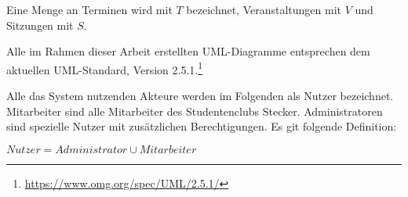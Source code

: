 Eine Menge an Terminen wird mit $T$ bezeichnet, Veranstaltungen mit $V$ und Sitzungen mit $S$.

Alle im Rahmen dieser Arbeit erstellten UML-Diagramme entsprechen dem aktuellen UML-Standard, Version 2.5.1.\footnote{\url{https://www.omg.org/spec/UML/2.5.1/}}

Alle das System nutzenden Akteure werden im Folgenden als Nutzer bezeichnet. Mitarbeiter sind alle Mitarbeiter des Studentenclubs Stecker. Administratoren sind spezielle Nutzer mit zusätzlichen Berechtigungen.
Es git folgende Definition:

$Nutzer = Administrator \cup Mitarbeiter$ 

